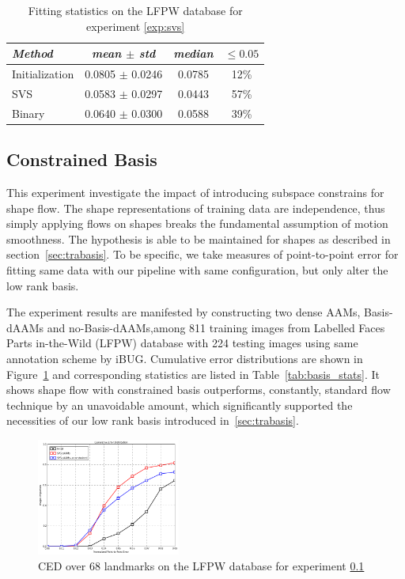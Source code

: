 \begin{table}[t]
\small
\centering
\begin{tabular}{|l|c|c|c|}
\hline
\emph{Method}       & \emph{mean $\pm$ std} & \emph{median} & $\leq 0.05$\\
\hline\hline
Initialization      & 0.0805 $\pm$ 0.0246 & 0.0785 & 12\%\\
SVS                 & 0.0583 $\pm$ 0.0297 & 0.0443 & 57\%\\
Binary              & 0.0640 $\pm$ 0.0300 & 0.0588 & 39\%\\
\hline
\end{tabular}
\caption{Fitting statistics on the LFPW database for experiment \ref{exp:svs}}
\label{tab:svs_stats}
\end{table}

\subsection{Constrained Basis}
\label{exp:basis}

This experiment investigate the impact of introducing subspace constrains for shape flow. The shape representations of training data are independence, thus simply applying flows on shapes breaks the fundamental assumption of motion smoothness. The hypothesis is able to be maintained for shapes as described in section~\ref{sec:trabasis}. To be specific, we take measures of point-to-point error for fitting same data with our pipeline with same configuration, but only alter the low rank basis. 

The experiment results are manifested by constructing two dense AAMs, Basis-dAAMs and no-Basis-dAAMs,among 811 training images from Labelled Faces Parts in-the-Wild (LFPW)\cite{Belhumeur2011} database with 224 testing images using same annotation scheme by iBUG. 
Cumulative error distributions are shown in Figure~\ref{fig:basis_ced} and corresponding statistics are listed in Table~\ref{tab:basis_stats}. 
It shows shape flow with constrained basis outperforms, constantly, standard flow technique by an unavoidable amount, which significantly supported the necessities of our low rank basis introduced in~\ref{sec:trabasis}.

\begin{figure}[t!]
\centering
\includegraphics[width=0.42\textwidth]{resources/basis_ced}
\caption{CED over 68 landmarks on the LFPW database for experiment \ref{exp:basis}}
\label{fig:basis_ced}
\end{figure}

